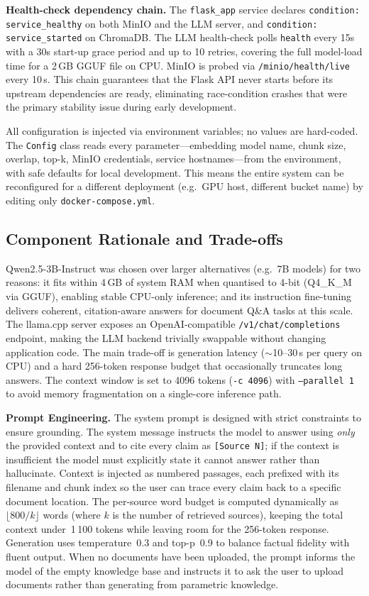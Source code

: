 \documentclass[10pt]{article}
\begin{document}
\textbf{Health-check dependency chain.}
The \texttt{flask\_app} service declares
\texttt{condition: service\_healthy} on both MinIO and the LLM server,
and \texttt{condition: service\_started} on ChromaDB.
The LLM health-check polls \texttt{health} every 15s with a 30s
start-up grace period and up to 10 retries, covering the full model-load time
for a 2\,GB GGUF file on CPU.
MinIO is probed via \texttt{/minio/health/live} every 10\,s.
This chain guarantees that the Flask API never starts before its upstream
dependencies are ready, eliminating race-condition crashes that were the
primary stability issue during early development.

All configuration is injected via environment variables; no values are
hard-coded. The \texttt{Config} class reads every parameter---embedding model
name, chunk size, overlap, top-k, MinIO credentials, service hostnames---from
the environment, with safe defaults for local development.
This means the entire system can be reconfigured for a different deployment
(e.g.\ GPU host, different bucket name) by editing only \texttt{docker-compose.yml}.

\subsection{Component Rationale and Trade-offs}

Qwen2.5-3B-Instruct was chosen over larger alternatives (e.g.\ 7B models) for
two reasons: it fits within 4\,GB of system RAM when quantised to 4-bit
(Q4\_K\_M via GGUF), enabling stable CPU-only inference; and its instruction
fine-tuning delivers coherent, citation-aware answers for document Q\&A tasks
at this scale.
The llama.cpp server exposes an OpenAI-compatible
\texttt{/v1/chat/completions} endpoint, making the LLM backend trivially
swappable without changing application code.
The main trade-off is generation latency ($\sim$10--30\,s per query on CPU)
and a hard 256-token response budget that occasionally truncates long answers.
The context window is set to 4096 tokens (\texttt{-c 4096}) with
\texttt{--parallel 1} to avoid memory fragmentation on a single-core
inference path.

\textbf{Prompt Engineering.}
The system prompt is designed with strict constraints to ensure grounding.
The system message instructs the model to answer using \emph{only} the
provided context and to cite every claim as \texttt{[Source N]}; if the
context is insufficient the model must explicitly state it cannot answer
rather than hallucinate.
Context is injected as numbered passages, each prefixed with its filename
and chunk index so the user can trace every claim back to a specific document
location.
The per-source word budget is computed dynamically as
$\lfloor 800 / k \rfloor$ words (where $k$ is the number of retrieved
sources), keeping the total context under~1\,100 tokens while leaving room
for the 256-token response.
Generation uses temperature~0.3 and top-p~0.9 to balance factual fidelity
with fluent output.
When no documents have been uploaded, the prompt informs the model of the
empty knowledge base and instructs it to ask the user to upload documents
rather than generating from parametric knowledge.
\end{document}
